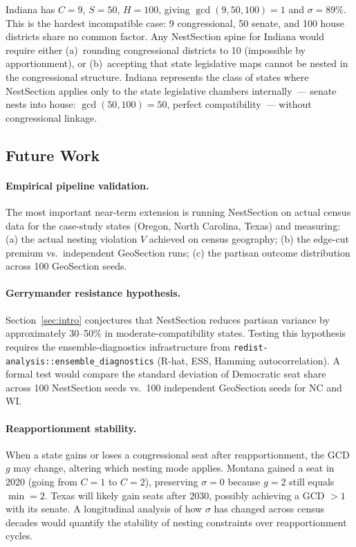 Indiana has $C = 9$, $S = 50$, $H = 100$, giving $\gcd(9, 50, 100) = 1$ and
$\sigma = 89\%$.  This is the hardest incompatible case: 9 congressional, 50
senate, and 100 house districts share no common factor.  Any NestSection spine
for Indiana would require either (a)~rounding congressional districts to 10
(impossible by apportionment), or (b)~accepting that state legislative maps
cannot be nested in the congressional structure.  Indiana represents the class
of states where NestSection applies only to the state legislative chambers
internally~--- senate nests into house: $\gcd(50, 100) = 50$, perfect
compatibility~--- without congressional linkage.

\subsection{Future Work}

\paragraph{Empirical pipeline validation.}
The most important near-term extension is running NestSection on actual census
data for the case-study states (Oregon, North Carolina, Texas) and measuring:
(a) the actual nesting violation $V$ achieved on census geography;
(b) the edge-cut premium vs.\ independent GeoSection runs;
(c) the partisan outcome distribution across 100 GeoSection seeds.

\paragraph{Gerrymander resistance hypothesis.}
Section~\ref{sec:intro} conjectures that NestSection reduces partisan variance
by approximately 30--50\% in moderate-compatibility states.  Testing this
hypothesis requires the ensemble-diagnostics infrastructure from
\texttt{redist-analysis::ensemble\_diagnostics} (R-hat, ESS, Hamming
autocorrelation).  A formal test would compare the standard deviation of
Democratic seat share across 100 NestSection seeds vs.\ 100 independent
GeoSection seeds for NC and WI.

\paragraph{Reapportionment stability.}
When a state gains or loses a congressional seat after reapportionment,
the GCD $g$ may change, altering which nesting mode applies.  Montana gained
a seat in 2020 (going from $C=1$ to $C=2$), preserving $\sigma=0$ because
$g=2$ still equals $\min = 2$.  Texas will likely gain seats after 2030,
possibly achieving a GCD $> 1$ with its senate.  A longitudinal analysis of
how $\sigma$ has changed across census decades would quantify the stability
of nesting constraints over reapportionment cycles.

